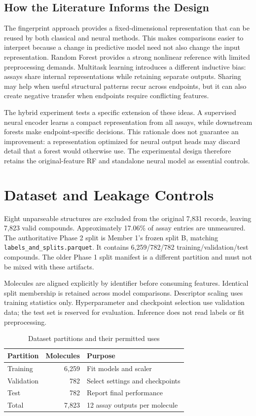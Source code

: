 \documentclass[conference]{IEEEtran}
\begin{document}
\subsection{How the Literature Informs the Design}
The fingerprint approach provides a fixed-dimensional representation that can be reused by both classical and neural methods. This makes comparisons easier to interpret because a change in predictive model need not also change the input representation. Random Forest provides a strong nonlinear reference with limited preprocessing demands. Multitask learning introduces a different inductive bias: assays share internal representations while retaining separate outputs. Sharing may help when useful structural patterns recur across endpoints, but it can also create negative transfer when endpoints require conflicting features.

The hybrid experiment tests a specific extension of these ideas. A supervised neural encoder learns a compact representation from all assays, while downstream forests make endpoint-specific decisions. This rationale does not guarantee an improvement: a representation optimized for neural output heads may discard detail that a forest would otherwise use. The experimental design therefore retains the original-feature RF and standalone neural model as essential controls.


\section{Dataset and Leakage Controls}
Eight unparseable structures are excluded from the original 7,831 records, leaving 7,823 valid compounds. Approximately 17.06\% of assay entries are unmeasured. The authoritative Phase 2 split is Member 1's frozen split B, matching \texttt{labels\_and\_splits.parquet}. It contains 6,259/782/782 training/validation/test compounds. The older Phase 1 split manifest is a different partition and must not be mixed with these artifacts.

Molecules are aligned explicitly by identifier before consuming features. Identical split membership is retained across model comparisons. Descriptor scaling uses training statistics only. Hyperparameter and checkpoint selection use validation data; the test set is reserved for evaluation. Inference does not read labels or fit preprocessing.

\begin{table}[t]
\caption{Dataset partitions and their permitted uses}
\label{tab:data}\centering
\begin{tabular}{lrp{}}\toprule
Partition & Molecules & Purpose\\\midrule
Training & 6,259 & Fit models and scaler\\
Validation & 782 & Select settings and checkpoints\\
Test & 782 & Report final performance\\\midrule
Total & 7,823 & 12 assay outputs per molecule\\\bottomrule
\end{tabular}
\end{table}
\end{document}
